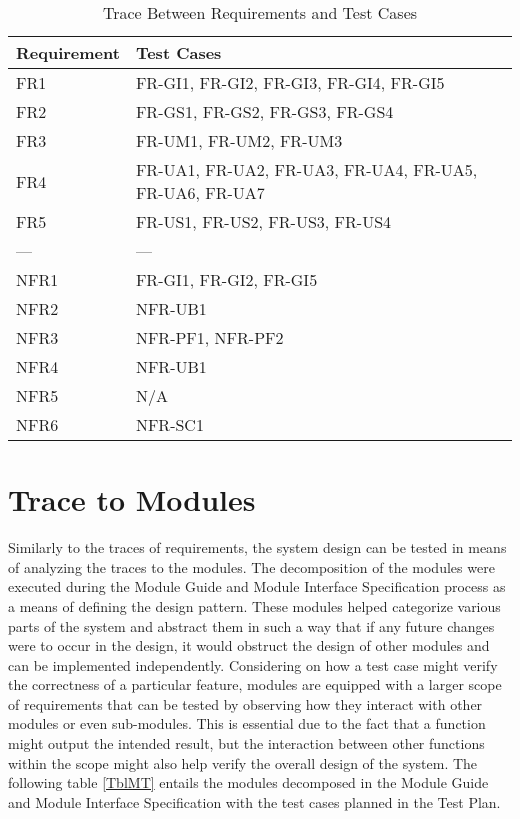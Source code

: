 \documentclass{article}
\begin{document}
\hfill
\begin{table}[H]
    \centering
    \begin{tabular}{p{} p{}}
        \toprule
        \textbf{Requirement} & \textbf{Test Cases} \\
        \midrule
         FR1 &  FR-GI1, FR-GI2, FR-GI3, FR-GI4, FR-GI5\\
         FR2 &  FR-GS1, FR-GS2, FR-GS3, FR-GS4\\
         FR3 &  FR-UM1, FR-UM2, FR-UM3\\
         FR4 &  FR-UA1, FR-UA2, FR-UA3, FR-UA4, FR-UA5, FR-UA6, FR-UA7\\
         FR5 &  FR-US1, FR-US2, FR-US3, FR-US4\\
         --- & --- \\
         NFR1 & FR-GI1, FR-GI2, FR-GI5\\
         NFR2 & NFR-UB1\\
         NFR3 & NFR-PF1, NFR-PF2 \\
         NFR4 & NFR-UB1\\
         NFR5 & N/A\\
         NFR6 & NFR-SC1\\
              \bottomrule
    \end{tabular}
    \caption{Trace Between Requirements and Test Cases}
    \label{TblRT}
\end{table}
		
\section{Trace to Modules}
Similarly to the traces of requirements, the system design can be tested in means of analyzing the traces to the modules. The decomposition of the modules were executed during the Module Guide and Module Interface Specification process as a means of defining the design pattern. These modules helped categorize various parts of the system and abstract them in such a way that if any future changes were to occur in the design, it would obstruct the design of other modules and can be implemented independently. Considering on how a test case might verify the correctness of a particular feature, modules are equipped with a larger scope of requirements that can be tested by observing how they interact with other modules or even sub-modules. This is essential due to the fact that a function might output the intended result, but the interaction between other functions within the scope might also help verify the overall design of the system. The following table \ref{TblMT} entails the modules decomposed in the Module Guide and Module Interface Specification with the test cases planned in the Test Plan.
\end{document}
